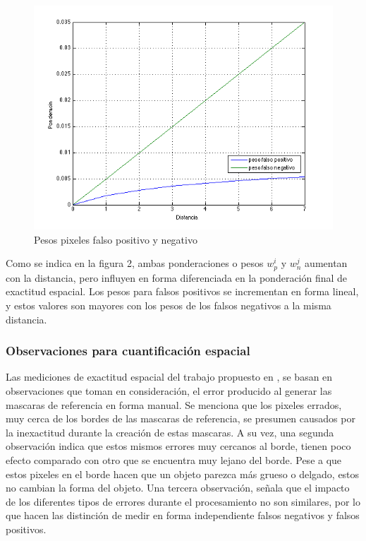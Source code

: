 \begin{figure}[!ht]
\centering
\includegraphics[scale=0.4]{img/ch4/PesosFalsoPositivoNegativo}
\caption{Pesos pixeles falso positivo y negativo}
\label{fig:Contexto espacial pesos para pixeles falso positivo y negativo}
\end{figure}

Como se indica en la figura 2, ambas ponderaciones o pesos $w^i_p$ y $w^j_n$ aumentan con la distancia, pero influyen en forma diferenciada en la ponderación final de exactitud espacial. Los pesos para falsos positivos se incrementan en forma lineal, y estos valores son mayores con los pesos de los falsos negativos a la misma distancia.

\subsubsection{Observaciones para cuantificación espacial}

Las mediciones de exactitud espacial del trabajo propuesto en \cite{liu_metrics_2011}, se basan en observaciones que toman en consideración, el error producido al generar las mascaras de referencia en forma manual. Se menciona que los pixeles errados, muy cerca de los bordes de las mascaras de referencia, se presumen causados por la inexactitud durante la creación de estas mascaras. A su vez, una segunda observación indica que estos mismos errores muy cercanos al borde, tienen poco efecto comparado con otro que se encuentra muy lejano del borde. Pese a que estos pixeles en el borde hacen que un objeto parezca más grueso o delgado, estos no cambian la forma del objeto. Una tercera observación, señala que el impacto de los diferentes tipos de errores durante el procesamiento no son similares, por lo que hacen las distinción de medir en forma independiente falsos negativos y falsos positivos. 

